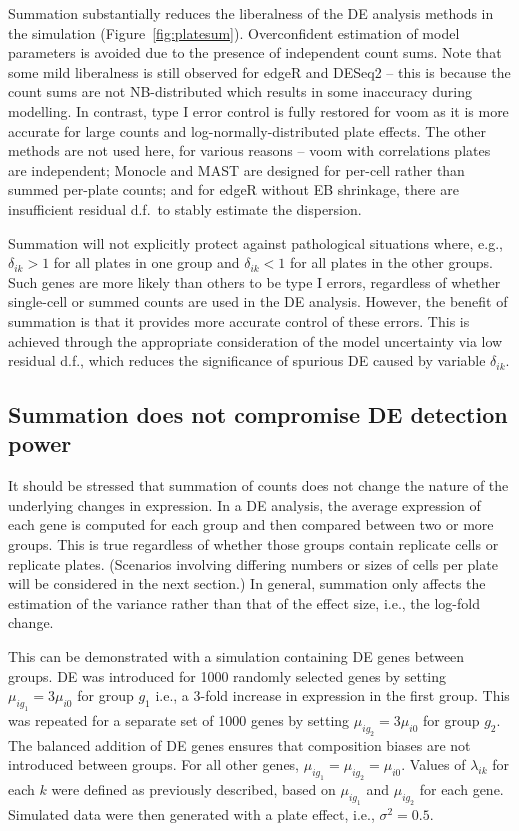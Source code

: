 \documentclass[oupdraft]{bio}
\begin{document}
Summation substantially reduces the liberalness of the DE analysis methods in the simulation (Figure~\ref{fig:platesum}).
Overconfident estimation of model parameters is avoided due to the presence of independent count sums.
Note that some mild liberalness is still observed for edgeR and DESeq2 
    -- this is because the count sums are not NB-distributed which results in some inaccuracy during modelling.
In contrast, type I error control is fully restored for voom as it is more accurate for large counts and log-normally-distributed plate effects.
The other methods are not used here, for various reasons -- voom with correlations  plates are independent;
    Monocle and MAST are designed for per-cell rather than summed per-plate counts;
    and for edgeR without EB shrinkage, there are insufficient residual d.f.\ to stably estimate the dispersion.

Summation will not explicitly protect against pathological situations where, e.g., $\delta_{ik} > 1$ for all plates in one group and $\delta_{ik} < 1$ for all plates in the other groups.
Such genes are more likely than others to be type I errors, regardless of whether single-cell or summed counts are used in the DE analysis.
However, the benefit of summation is that it provides more accurate control of these errors.
This is achieved through the appropriate consideration of the model uncertainty via low residual d.f., which reduces the significance of spurious DE caused by variable $\delta_{ik}$.

\subsection{Summation does not compromise DE detection power}
It should be stressed that summation of counts does not change the nature of the underlying changes in expression.
In a DE analysis, the average expression of each gene is computed for each group and then compared between two or more groups.
This is true regardless of whether those groups contain replicate cells or replicate plates. 
(Scenarios involving differing numbers or sizes of cells per plate will be considered in the next section.)
In general, summation only affects the estimation of the variance rather than that of the effect size, i.e., the log-fold change.

This can be demonstrated with a simulation containing DE genes between groups.
DE was introduced for 1000 randomly selected genes by setting $\mu_{ig_1} = 3\mu_{i0}$ for group $g_1$ i.e., a 3-fold increase in expression in the first group.
This was repeated for a separate set of 1000 genes by setting $\mu_{ig_2} = 3\mu_{i0}$ for group $g_2$.
The balanced addition of DE genes ensures that composition biases \citep{robinson2010scaling} are not introduced between groups.
For all other genes, $\mu_{ig_1}=\mu_{ig_2}=\mu_{i0}$.
Values of $\lambda_{ik}$ for each $k$ were defined as previously described, based on $\mu_{ig_1}$ and $\mu_{ig_2}$ for each gene.
Simulated data were then generated with a plate effect, i.e., $\sigma^2=0.5$.
\end{document}
